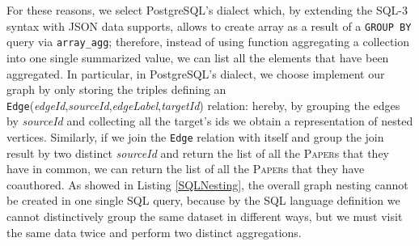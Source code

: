 For these reasons, we select PostgreSQL's dialect which, by extending the SQL-3 syntax with JSON data supports, allows to create array as a result of a \texttt{GROUP BY} query via \texttt{array\_agg}; therefore, instead of using function aggregating a collection into one single summarized value, we can list all the elements that have been aggregated. In particular, in PostgreSQL's dialect, we choose implement our graph by only storing the triples defining an \texttt{Edge}(\textit{edgeId},\;\textit{sourceId},\;\textit{edgeLabel},\;\textit{targetId}) relation: hereby, by grouping the edges by \textit{sourceId} and collecting all the target's ids we obtain a representation of nested vertices. Similarly, if we join the \texttt{Edge} relation with itself and group the join result by two distinct \textit{sourceId} and return the list of all the \textsc{Paper}s that they have in common, we can return the list of all the \textsc{Paper}s that they have coauthored. As showed in Listing \ref{SQLNesting}, the overall graph nesting cannot be created in one single SQL query, because by  the SQL language definition we cannot distinctively group the same dataset in different ways, but we must visit the same data twice and perform two distinct aggregations. 


